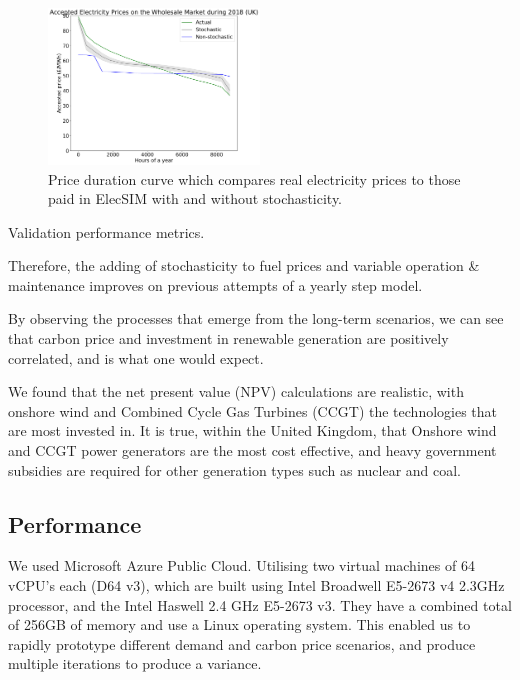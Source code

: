 \begin{figure}[H]
	\begin{center}
		\includegraphics[width=0.5\textwidth]{figures/load_price_duration_curve_comparison.pdf}
		\caption{Price duration curve which compares real electricity prices to those paid in ElecSIM with and without stochasticity.}
		\label{fig:price_duration_curve}
	\end{center}
\end{figure}

\begin{table}[h]
	\centering
	\caption{Validation performance metrics.}
	\label{table:validation_metrics}
\end{table}

Therefore, the adding of stochasticity to fuel prices and variable operation \& maintenance improves on previous attempts of a yearly step model.

By observing the processes that emerge from the long-term scenarios, we can see that carbon price and investment in renewable generation are positively correlated, and is what one would expect.

We found that the net present value (NPV) calculations are realistic, with onshore wind and Combined Cycle Gas Turbines (CCGT) the technologies that are most invested in. It is true, within the United Kingdom, that Onshore wind and CCGT power generators are the most cost effective, and heavy government subsidies are required for other generation types such as nuclear and coal. 



\subsection{Performance}

 We used Microsoft Azure Public Cloud. Utilising two virtual machines of 64 vCPU's each (D64 v3), which are built using Intel Broadwell E5-2673 v4 2.3GHz processor, and the Intel Haswell 2.4 GHz E5-2673 v3. They have a combined total of 256GB of memory and use a Linux operating system. This enabled us to rapidly prototype different demand and carbon price scenarios, and produce multiple iterations to produce a variance.


